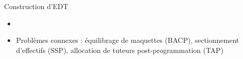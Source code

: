 \documentclass{beamer}
\begin{document}
\begin{frame}{Construction d'EDT}
\begin{table}[!ht]
        \label{tab:my_label}
        
    \end{table}
    \vspace{-0.5cm}
    \begin{itemize}
       \item[] 
        \item Problèmes connexes : équilibrage de maquettes (BACP), sectionnement d'effectifs (SSP), allocation de tuteurs post-programmation (TAP)
    \end{itemize}

\end{frame}
\end{document}
